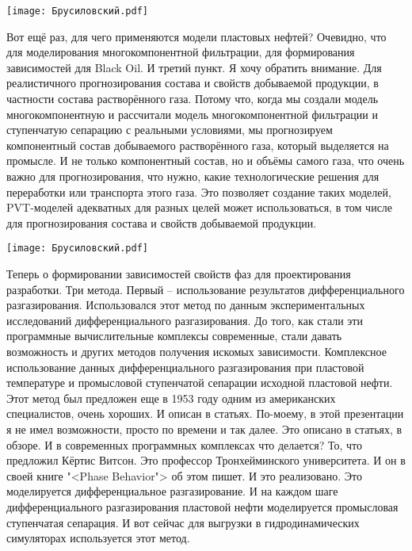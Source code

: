 \documentclass[main.tex]{subfiles}
\begin{document}
\begin{center}
\texttt{[image: Брусиловский.pdf]}
\end{center}

Вот ещё раз, для чего применяются модели пластовых нефтей?
Очевидно, что для моделирования многокомпонентной фильтрации, для формирования зависимостей для Black Oil.
И третий пункт.
Я хочу обратить внимание.
Для реалистичного прогнозирования состава и свойств добываемой продукции, в частности состава растворённого газа.
Потому что, когда мы создали модель многокомпонентную и рассчитали модель многокомпонентной фильтрации и ступенчатую сепарацию с реальными условиями, мы прогнозируем компонентный состав добываемого растворённого газа, который выделяется на промысле.
И не только компонентный состав, но и объёмы самого газа, что очень важно для прогнозирования, что нужно, какие технологические решения для переработки или транспорта этого газа.
Это позволяет создание таких моделей, PVT-моделей адекватных для разных целей может использоваться, в том числе для прогнозирования состава и свойств добываемой продукции.

\begin{center}
\texttt{[image: Брусиловский.pdf]}
\end{center}

Теперь о формировании зависимостей свойств фаз для проектирования разработки.
Три метода.
Первый -- использование результатов дифференциального разгазирования.
Использовался этот метод по данным экспериментальных исследований дифференциального разгазирования.
До того, как стали эти программные вычислительные комплексы современные, стали давать возможность и других методов получения искомых зависимости.
Комплексное использование данных дифференциального разгазирования при пластовой температуре и промысловой ступенчатой сепарации исходной пластовой нефти.
Этот метод был предложен еще в 1953 году одним из американских специалистов, очень хороших.
И описан в статьях.
По-моему, в этой презентации я не имел возможности, просто по времени и так далее.
Это описано в статьях, в обзоре.
И в современных программных комплексах что делается?
То, что предложил Кёртис Витсон.
Это профессор Тронхейминского университета.
И он в своей книге "<Phase Behavior"> об этом пишет.
И это реализовано.
Это моделируется дифференциальное разгазирование.
И на каждом шаге дифференциального разгазирования пластовой нефти моделируется промысловая ступенчатая сепарация.
И вот сейчас для выгрузки в гидродинамических симуляторах используется этот метод.
\end{document}

